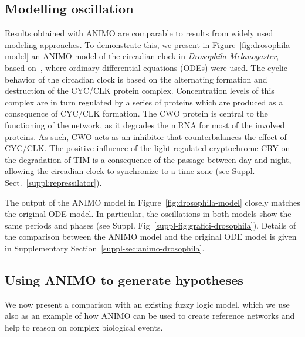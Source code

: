 \documentclass{bmcart}
\def\tas{Timed Automata}
\begin{document}
\subsection*{Modelling oscillation}\label{sec:animo-drosophila}
Results obtained with ANIMO are comparable to results from widely used modeling
approaches. To demonstrate this, we present in Figure~\ref{fig:drosophila-model}
an ANIMO model of the circadian clock in \emph{Drosophila Melanogaster}, based on~\cite{drosophila-ode-model},
where ordinary differential equations (ODEs) were used.
The cyclic behavior of the circadian clock is based on the alternating formation and destruction of the
CYC/CLK protein complex.
Concentration levels of this complex are in turn regulated by a series of proteins which are produced as
a consequence of CYC/CLK formation. The CWO protein
is central to the functioning of the network, as it degrades the mRNA for most of the involved proteins.
As such, CWO acts as an inhibitor that counterbalances the effect of CYC/CLK.
The positive influence of the light-regulated cryptochrome CRY on the degradation of TIM is a consequence
of the passage between day and night, allowing
the circadian clock to synchronize to a time zone (see Suppl. Sect.~\ref{suppl:repressilator}).




The output of the ANIMO model in Figure~\ref{fig:drosophila-model} closely matches the original ODE model.
In particular, the oscillations in both models show the same periods and phases (see Suppl. Fig~\ref{suppl-fig:grafici-drosophila}).
Details of the comparison
between the ANIMO model and the original ODE model is given in Supplementary Section~\ref{suppl-sec:animo-drosophila}.




\subsection*{Using ANIMO to generate hypotheses}\label{subsec:case-study-larger}
We now present a comparison with an existing fuzzy logic model, which we use also as an example of how ANIMO can be used to create reference networks and help to reason on complex biological events.
\end{document}
